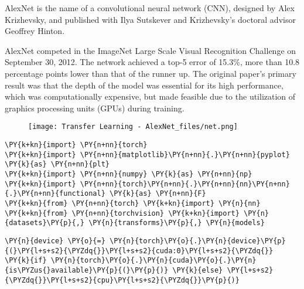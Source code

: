     AlexNet is the name of a convolutional neural network (CNN), designed by Alex Krizhevsky, and published with Ilya Sutskever and Krizhevsky's doctoral advisor Geoffrey Hinton.

    AlexNet competed in the ImageNet Large Scale Visual Recognition Challenge on September 30, 2012. The network achieved a top-5 error of 15.3\%, more than 10.8 percentage points lower than that of the runner up. The original paper's primary result was that the depth of the model was essential for its high performance, which was computationally expensive, but made feasible due to the utilization of graphics processing units (GPUs) during training.\\

    \begin{figure}[h]
        \centering
        \texttt{[image: Transfer Learning - AlexNet\_files/net.png]}
    \end{figure}

    \begin{tcolorbox}[breakable, size=fbox, boxrule=1pt, pad at break*=1mm,colback=cellbackground, colframe=cellborder]
\begin{Verbatim}[commandchars=\\\{\}]
\PY{k+kn}{import} \PY{n+nn}{torch}
\PY{k+kn}{import} \PY{n+nn}{matplotlib}\PY{n+nn}{.}\PY{n+nn}{pyplot} \PY{k}{as} \PY{n+nn}{plt}
\PY{k+kn}{import} \PY{n+nn}{numpy} \PY{k}{as} \PY{n+nn}{np}
\PY{k+kn}{import} \PY{n+nn}{torch}\PY{n+nn}{.}\PY{n+nn}{nn}\PY{n+nn}{.}\PY{n+nn}{functional} \PY{k}{as} \PY{n+nn}{F}
\PY{k+kn}{from} \PY{n+nn}{torch} \PY{k+kn}{import} \PY{n}{nn}
\PY{k+kn}{from} \PY{n+nn}{torchvision} \PY{k+kn}{import} \PY{n}{datasets}\PY{p}{,} \PY{n}{transforms}\PY{p}{,} \PY{n}{models}
\end{Verbatim}
\end{tcolorbox}

    \begin{tcolorbox}[breakable, size=fbox, boxrule=1pt, pad at break*=1mm,colback=cellbackground, colframe=cellborder]
\begin{Verbatim}[commandchars=\\\{\}]
\PY{n}{device} \PY{o}{=} \PY{n}{torch}\PY{o}{.}\PY{n}{device}\PY{p}{(}\PY{l+s+s2}{\PYZdq{}}\PY{l+s+s2}{cuda:0}\PY{l+s+s2}{\PYZdq{}} \PY{k}{if} \PY{n}{torch}\PY{o}{.}\PY{n}{cuda}\PY{o}{.}\PY{n}{is\PYZus{}available}\PY{p}{(}\PY{p}{)} \PY{k}{else} \PY{l+s+s2}{\PYZdq{}}\PY{l+s+s2}{cpu}\PY{l+s+s2}{\PYZdq{}}\PY{p}{)}
\end{Verbatim}
\end{tcolorbox}

